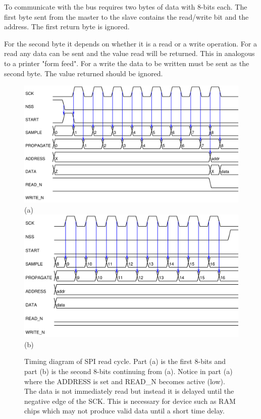 \documentclass{article}
\begin{document}
To communicate with the bus requires two bytes of data with
8-bits each.
The first byte sent from the master to the slave
contains the read/write bit and the address.
The first return byte is ignored.

For the second byte it depends on whether it is a read or
a write operation.
For a read any data can be sent and the value read will be
returned.  This in analogous to a printer "form feed".
For a write the data to be written must be sent as the second
byte.
The value returned should be ignored.

\begin{figure}
\center
\includegraphics[scale=0.7]{figure/spi_ctl-timing/read-byte1} \\
(a) \\
\includegraphics[scale=0.7]{figure/spi_ctl-timing/read-byte2} \\
(b)
\caption{Timing diagram of SPI read cycle.
Part (a) is the first 8-bits and part (b) is the second
8-bits continuing from (a).
Notice in part (a) where the ADDRESS is set and READ\_N becomes active (low).
The data is not immediately read but instead it is delayed until
the negative edge of the SCK.
This is necessary for device such as RAM chips which may not produce
valid data until a short time delay.}
\label{fig:spi_read}
\end{figure}
\end{document}
